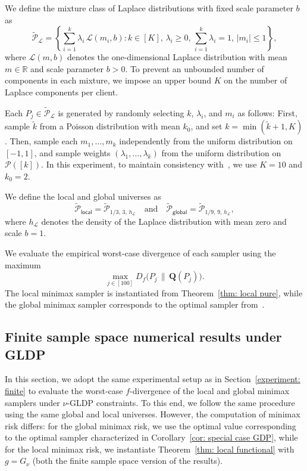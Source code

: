\documentclass[accepted]{article}
\theoremstyle{plain} %
\theoremstyle{definition}
\theoremstyle{remark}
\begin{document}
We define the mixture class of Laplace distributions with fixed scale parameter \( b \) as
\[
\tilde{\mathcal{P}}_{\mathcal{L}} = \left\{ \sum_{i=1}^k \lambda_i \, \mathcal{L}(m_i, b) : k \in [K],\, \lambda_i \geq 0,\, \sum_{i=1}^k \lambda_i = 1,\, |m_i| \leq 1 \right\},
\]
where \( \mathcal{L}(m, b) \) denotes the one-dimensional Laplace distribution with mean \( m \in \mathbb{R} \) and scale parameter \( b > 0 \). To prevent an unbounded number of components in each mixture, we impose an upper bound \( K \) on the number of Laplace components per client.

Each \( P_j \in \tilde{\mathcal{P}}_{\mathcal{L}} \) is generated by randomly selecting \( k \), \( \lambda_i \), and \( m_i \) as follows:  
First, sample \( \tilde{k} \) from a Poisson distribution with mean \( k_0 \), and set \( k = \min(\tilde{k} + 1, K) \). Then, sample each \( m_1, \ldots, m_k \) independently from the uniform distribution on \( [-1, 1] \), and sample weights \( (\lambda_1, \ldots, \lambda_k) \) from the uniform distribution on \( \mathcal{P}([k]) \). In this experiment, to maintain consistency with~\citet{park2024exactly}, we use \( K = 10 \) and \( k_0 = 2 \).

We define the local and global universes as
\[
\tilde{\mathcal{P}}_{\textsf{local}} = \tilde{\mathcal{P}}_{1/3,\, 3,\, h_{\mathcal{L}}}
\quad \text{and} \quad
\tilde{\mathcal{P}}_{\textsf{global}} = \tilde{\mathcal{P}}_{1/9,\, 9,\, h_{\mathcal{L}}},
\]
where \( h_{\mathcal{L}} \) denotes the density of the Laplace distribution with mean zero and scale \( b = 1 \).

We evaluate the empirical worst-case divergence of each sampler using the maximum
\[
\max_{j \in [100]} D_f\bigl(P_j \,\|\, \mathbf{Q}(P_j)\bigr).
\]
The local minimax sampler is instantiated from Theorem~\ref{thm: local pure}, while the global minimax sampler corresponds to the optimal sampler from~\citep[Theorem 3.3]{park2024exactly}.



\subsection{Finite sample space numerical results under  GLDP}  \label{appendix: experiment GDP local global discrete}

In this section, we adopt the same experimental setup as in Section~\ref{experiment: finite} to evaluate the worst-case $f$-divergence of the local and global minimax samplers under $\nu$-GLDP constraints. To this end, we follow the same procedure using the same global and local universes. However, the computation of minimax risk differs: for the global minimax risk, we use the optimal value corresponding to the optimal sampler characterized in Corollary~\ref{cor: special case GDP}, while for the local minimax risk, we instantiate  Theorem~\ref{thm: local functional} with $g = G_\nu$ (both the finite sample space version of the results).
\end{document}

